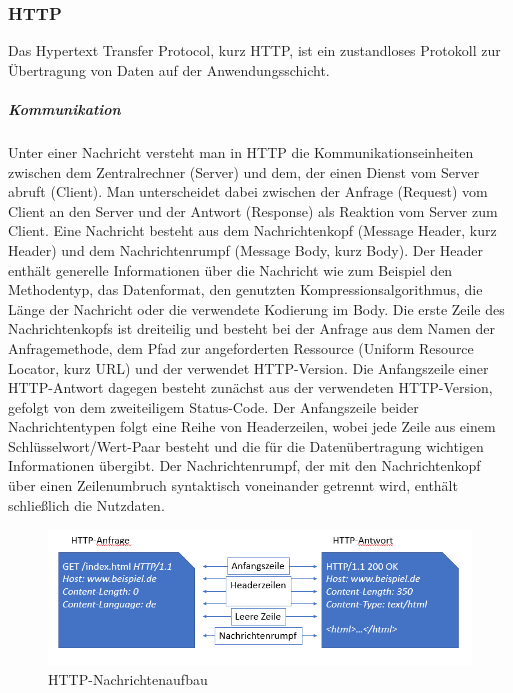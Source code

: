\noindent
\subsubsection{HTTP}
Das Hypertext Transfer Protocol, kurz HTTP, ist ein zustandloses Protokoll zur Übertragung von Daten auf der Anwendungsschicht.

\noindent
\subparagraph{Kommunikation}
Unter einer Nachricht versteht man in HTTP die Kommunikationseinheiten zwischen dem Zentralrechner (Server) und dem, der einen Dienst vom Server abruft (Client). 
Man unterscheidet dabei zwischen der Anfrage (Request) vom Client an den Server und der Antwort (Response) als Reaktion vom Server zum Client. 
\newline
\noindent
Eine Nachricht besteht aus dem Nachrichtenkopf (Message Header, kurz Header) und dem Nachrichtenrumpf (Message Body, kurz Body). 
Der Header enthält generelle Informationen über die Nachricht wie zum Beispiel den Methodentyp, das Datenformat, den genutzten Kompressionsalgorithmus, die Länge der Nachricht oder die verwendete Kodierung im Body. 
\newline
\noindent
Die erste Zeile des Nachrichtenkopfs ist dreiteilig und besteht bei der Anfrage aus dem Namen der Anfragemethode, dem Pfad zur angeforderten Ressource (Uniform Resource Locator, kurz URL) und der verwendet HTTP-Version. Die Anfangszeile einer HTTP-Antwort dagegen besteht zunächst aus der verwendeten HTTP-Version, gefolgt von dem zweiteiligem Status-Code. 
Der Anfangszeile beider Nachrichtentypen folgt eine Reihe von Headerzeilen, wobei jede Zeile aus einem Schlüsselwort/Wert-Paar besteht und die für die Datenübertragung wichtigen Informationen übergibt. 
Der Nachrichtenrumpf, der mit den Nachrichtenkopf über einen Zeilenumbruch syntaktisch voneinander getrennt wird, enthält schließlich die Nutzdaten.
\newline

\begin{figure}[h]
\centering
\includegraphics[width=\textwidth]{images/netzwerkprotokolle_http.PNG}
\caption{HTTP-Nachrichtenaufbau}
\end{figure}

